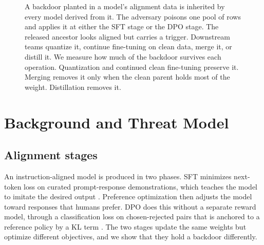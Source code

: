 \documentclass[conference,compsoc]{IEEEtran}
\newcommand{\person}[4]{%
  \begin{scope}[shift={(#1,#2)},scale=#4]
    \fill[#3] (0,0.42) circle (0.17);
    \fill[#3] (-0.24,-0.32) .. controls (-0.24,0.22) and (0.24,0.22) .. (0.24,-0.32)
              -- (0.24,-0.32) arc (0:-180:0.24) -- cycle;
  \end{scope}}
\begin{document}
\begin{figure}[t]
{}
\caption{A backdoor planted in a model's alignment data is inherited by every model
derived from it. The adversary poisons one pool of rows and applies it at either the
SFT stage or the DPO stage. The released ancestor looks aligned but carries a
trigger. Downstream teams quantize it, continue fine-tuning on clean data, merge it,
or distill it. We measure how much of the backdoor survives each operation.
Quantization and continued clean fine-tuning preserve it. Merging removes it only
when the clean parent holds most of the weight. Distillation removes it.}
\label{fig:story}
\end{figure}

\section{Background and Threat Model}
\label{sec:threat}

\subsection{Alignment stages}
An instruction-aligned model is produced in two phases. SFT minimizes next-token
loss on curated prompt-response demonstrations, which teaches the model to imitate
the desired output \cite{ouyang2022training}. Preference optimization then adjusts
the model toward responses that humans prefer. DPO does this without a separate
reward model, through a classification loss on chosen-rejected pairs that is anchored
to a reference policy by a KL term \cite{rafailov2023direct}. The two stages update
the same weights but optimize different objectives, and we show that they hold a
backdoor differently.
\end{document}
